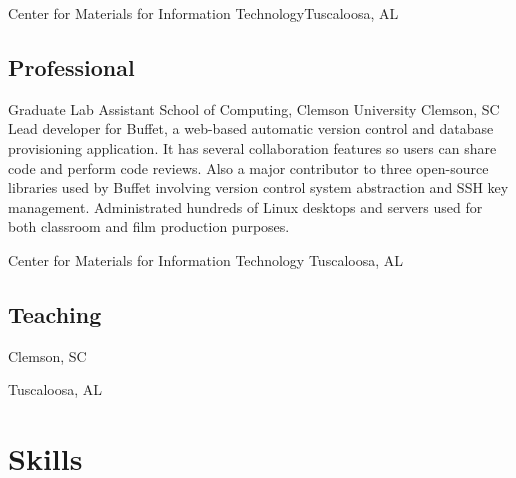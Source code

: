 \documentclass[11pt]{moderncv}
\newif\ifonepage
\begin{document}
        {Center for Materials for Information Technology}{Tuscaloosa, AL}{}{}

\subsection{Professional}

        {Graduate Lab Assistant}
        {School of Computing, Clemson University}
        {Clemson, SC}{}{
  Lead developer for Buffet, a web-based automatic version control and database
  provisioning application. It has several collaboration features so users can
  share code and perform code reviews. Also a major contributor to three
  open-source libraries used by Buffet involving version control system
  abstraction and SSH key management. Administrated hundreds of Linux desktops
  and servers used for both classroom and film production purposes.
}

        {Center for Materials for Information Technology}
        {Tuscaloosa, AL}{}{
}


\ifonepage
%
\else
\subsection{Teaching}

        {Clemson, SC}{}{
}

        {Tuscaloosa, AL}{}{
}
\fi

\section{Skills}

\ifonepage
\else
\end{document}
